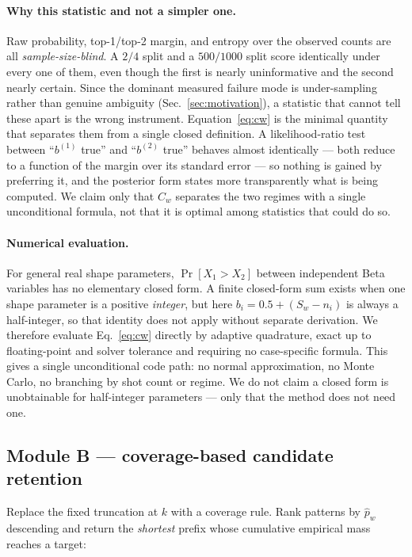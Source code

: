 \documentclass[preprint,11pt]{elsarticle}
\newcommand{\Cw}{C_w}
\begin{document}
\paragraph{Why this statistic and not a simpler one.}
Raw probability, top-1/top-2 margin, and entropy over the observed counts
are all \emph{sample-size-blind}. A $2/4$ split and a $500/1000$ split
score identically under every one of them, even though the first is
nearly uninformative and the second nearly certain. Since the dominant
measured failure mode is under-sampling rather than genuine ambiguity
(Sec.~\ref{sec:motivation}), a statistic that cannot tell these apart is
the wrong instrument. Equation~\eqref{eq:cw} is the minimal quantity that
separates them from a single closed definition. A likelihood-ratio test
between ``$b^{(1)}$ true'' and ``$b^{(2)}$ true'' behaves almost
identically --- both reduce to a function of the margin over its standard
error --- so nothing is gained by preferring it, and the posterior form
states more transparently what is being computed. We claim only that
$\Cw$ separates the two regimes with a single unconditional formula, not
that it is optimal among statistics that could do so.

\paragraph{Numerical evaluation.} For general real shape parameters,
$\Pr[X_1>X_2]$ between independent Beta variables has no elementary
closed form. A finite closed-form sum exists when one shape parameter is
a positive \emph{integer}, but here $b_i=0.5+(S_w-n_i)$ is always a
half-integer, so that identity does not apply without separate
derivation. We therefore evaluate Eq.~\eqref{eq:cw} directly by adaptive
quadrature, exact up to floating-point and solver tolerance and requiring
no case-specific formula. This gives a single unconditional code path: no
normal approximation, no Monte Carlo, no branching by shot count or
regime. We do not claim a closed form is unobtainable for half-integer
parameters --- only that the method does not need one.

\subsection{Module B --- coverage-based candidate retention}
\label{sec:moduleB}

Replace the fixed truncation at $k$ with a coverage rule. Rank patterns
by $\hat p_w$ descending and return the \emph{shortest} prefix whose
cumulative empirical mass reaches a target:
\end{document}
